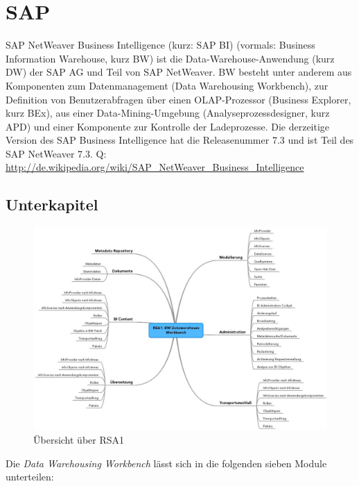 \chapter{SAP}
\label{Kapitel:Einleitung}

SAP NetWeaver Business Intelligence (kurz: SAP BI) (vormals: Business Information Warehouse, kurz BW) ist die Data-Warehouse-Anwendung (kurz DW) der SAP AG und Teil von SAP NetWeaver. BW besteht unter anderem aus Komponenten zum Datenmanagement (Data Warehousing Workbench), zur Definition von Benutzerabfragen über einen OLAP-Prozessor (Business Explorer, kurz BEx), aus einer Data-Mining-Umgebung (Analyseprozessdesigner, kurz APD) und einer Komponente zur Kontrolle der Ladeprozesse. Die derzeitige Version des SAP Business Intelligence hat die Releasenummer 7.3 und ist Teil des SAP NetWeaver 7.3. 
Q: \url{http://de.wikipedia.org/wiki/SAP_NetWeaver_Business_Intelligence}


\section{Unterkapitel}
\label{Abschnitt:Motivation}

\begin{figure}[H]
    \centering
    \includegraphics[width=1\textwidth]{files/RSA1Mindmap}
    \caption{Übersicht über RSA1}
    \label{pic:DWOverview}
\end{figure}


Die \textit{ Data Warehousing Workbench} lässt sich in die folgenden sieben Module unterteilen:\\


